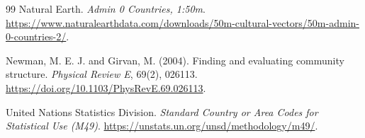 \documentclass[12pt,a4paper]{article}
\begin{document}
\begin{thebibliography}{99}
Natural Earth.
\textit{Admin 0 Countries, 1:50m}.
\url{https://www.naturalearthdata.com/downloads/50m-cultural-vectors/50m-admin-0-countries-2/}.

Newman, M. E. J. and Girvan, M. (2004).
Finding and evaluating community structure.
\textit{Physical Review E}, 69(2), 026113.
\url{https://doi.org/10.1103/PhysRevE.69.026113}.

United Nations Statistics Division.
\textit{Standard Country or Area Codes for Statistical Use (M49)}.
\url{https://unstats.un.org/unsd/methodology/m49/}.

\end{thebibliography}
\end{document}

